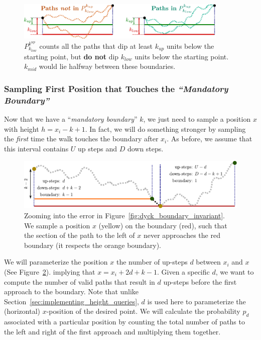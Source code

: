 \begin{figure}[htpb]
    \centering
    \includegraphics[width=0.9\textwidth]{images/dyck_mandatory_boundary.pdf}
    \caption{$P_{k_{low}}^{k^{up}}$ counts all the paths that dip at least $k_{up}$ units below the starting point,
    but \textbf{do not} dip $k_{low}$ units below the starting point. $k_{mid}$ would lie halfway between these boundaries.}
    \label{fig:dyck_mandatory_boundary}
\end{figure}



\subsubsection{Sampling First Position that Touches the \emph{``Mandatory Boundary''}}
\label{sec:sampling_first_position_touching_mandatory_boundary}

Now that we have a ``\emph{mandatory boundary}'' $k$, we just need to sample a position $x$ with height $h = x_i-k+1$.
In fact, we will do something stronger by sampling the \emph{first} time the walk touches the boundary after $x_i$.
As before, we assume that this interval contains $U$ up steps and $D$ down steps.
\begin{figure}[htpb]
    \centering
    \includegraphics[width=\textwidth]{images/dyck_first_approach_sampling.pdf}
    \caption{Zooming into the error in Figure~\ref{fig:dyck_boundary_invariant}.
        We sample a position $x$ (yellow) on the boundary (red),
        such that the section of the path to the left of $x$ never approaches the red boundary (it respects the orange boundary).}
    \label{fig:dyck_mandatory_boundary_sampling}
\end{figure}

We will parameterize the position $x$ the number of up-steps $d$ between $x_i$ and $x$ (See Figure~\ref{fig:dyck_mandatory_boundary_sampling}).
implying that $x = x_{i} + 2d + k - 1$.
Given a specific $d$, we want to compute the number of valid paths that result in
$d$ up-steps before the first approach to the boundary.
Note that unlike Section~\ref{sec:implementing_height_queries}, $d$ is used here to parameterize the (horizontal) $x$-position of the desired point.
We will calculate the probability $p_d$ associated with a particular position
by counting the total number of paths to the left and right of the first approach and multiplying them together.

